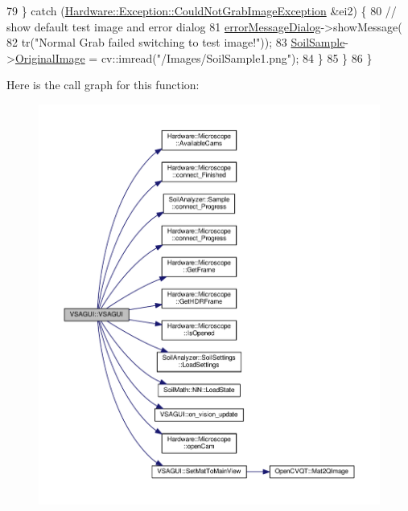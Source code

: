 \begin{DoxyCode}
79     \} \textcolor{keywordflow}{catch} (\hyperlink{class_hardware_1_1_exception_1_1_could_not_grab_image_exception}{Hardware::Exception::CouldNotGrabImageException}
       &ei2) \{
80       \textcolor{comment}{// show default test image and error dialog}
81       \hyperlink{class_v_s_a_g_u_i_af01408e987e5df2ce336ee8447841c1f}{errorMessageDialog}->showMessage(
82           tr(\textcolor{stringliteral}{"Normal Grab failed switching to test image!"}));
83       \hyperlink{class_v_s_a_g_u_i_ac90517c9baea0a75455d43d5eb77d3e7}{SoilSample}->\hyperlink{class_soil_analyzer_1_1_sample_a0d6e6fca9e232a77329daf0b4b29c634}{OriginalImage} = cv::imread(\textcolor{stringliteral}{"/Images/SoilSample1.png"});
84     \}
85   \}
86 \}
\end{DoxyCode}


Here is the call graph for this function\+:
\nopagebreak
\begin{figure}[H]
\begin{center}
\leavevmode
\includegraphics[width=350pt]{class_v_s_a_g_u_i_a987a20380023fe5985bd1fef0491af40_cgraph}
\end{center}
\end{figure}


\hypertarget{class_v_s_a_g_u_i_ac68bb20d33069fc7f437e7daed3fcc0d}{}
